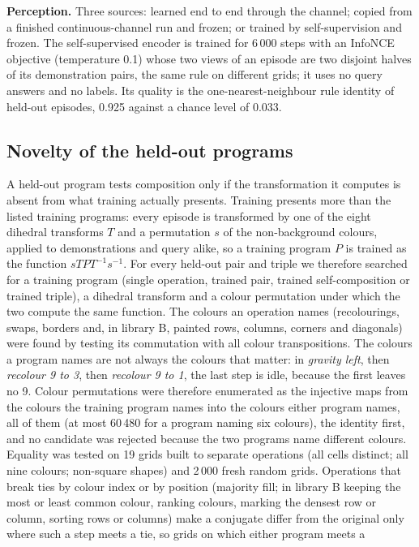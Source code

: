 \documentclass{nature}
\begin{document}
\begin{methods}
\textbf{Perception.} Three sources: learned end to end through the channel; copied from a finished
continuous-channel run and frozen; or trained by self-supervision and frozen. The self-supervised
encoder is trained for 6\,000 steps with an InfoNCE objective (temperature 0.1) whose two views of an
episode are two disjoint halves of its demonstration pairs, the same rule on different grids; it uses
no query answers and no labels. Its quality is the one-nearest-neighbour rule identity of held-out
episodes, 0.925 against a chance level of 0.033.

\subsection{Novelty of the held-out programs}
A held-out program tests composition only if the transformation it computes is absent from what training
actually presents. Training presents more than the listed training programs: every episode is transformed by one
of the eight dihedral transforms $T$ and a permutation $s$ of the non-background colours, applied to demonstrations
and query alike, so a training program $P$ is trained as the function $sTPT^{-1}s^{-1}$. For every held-out pair and
triple we therefore searched for a training program (single operation, trained pair, trained self-composition or
trained triple), a dihedral transform and a colour permutation under which the two compute the same function.
The colours an operation names (recolourings, swaps, borders and, in library B, painted rows, columns, corners
and diagonals) were found by testing its commutation with all colour transpositions. The colours a program names
are not always the colours that matter: in \emph{gravity left}, then \emph{recolour 9 to 3}, then \emph{recolour 9
to 1}, the last step is idle, because the first leaves no 9. Colour permutations were therefore enumerated as the
injective maps from the colours the training program names into the colours either program names, all of them
(at most 60\,480 for a program naming six colours), the identity first, and no candidate was rejected because the
two programs name different colours. Equality was tested on 19
grids built to separate operations (all cells distinct; all nine colours; non-square shapes) and 2\,000 fresh
random grids. Operations that break ties by colour index or by position (majority fill; in library B keeping the
most or least common colour, ranking colours, marking the densest row or column, sorting rows or columns) make a
conjugate differ from the original only where such a step meets a tie, so grids on which either program meets a

\end{methods}
\end{document}
